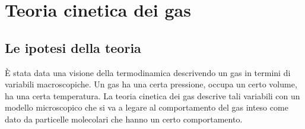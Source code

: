 \documentclass[10pt,a4paper]{book}
\begin{document}
\section{Teoria cinetica dei gas}

\subsection{Le ipotesi della teoria}

È stata data una visione della termodinamica descrivendo un gas in termini di variabili macroscopiche. Un gas ha una certa pressione, occupa un certo volume, ha una certa temperatura. La teoria cinetica dei gas descrive tali variabili con un modello microscopico che si va a legare al comportamento del gas inteso come dato da particelle molecolari che hanno un certo comportamento.
\end{document}
